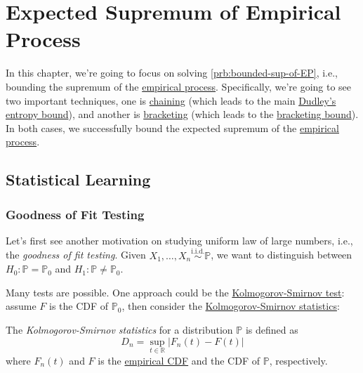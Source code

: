 \chapter{Expected Supremum of Empirical Process}
In this chapter, we're going to focus on solving \autoref{prb:bounded-sup-of-EP}, i.e., bounding the supremum of the \hyperref[def:EP]{empirical process}. Specifically, we're going to see two important techniques, one is \hyperref[note:chaining]{chaining} (which leads to the main \hyperref[thm:Dudley-entropy-bound]{Dudley's entropy bound}), and another is \hyperref[def:bracketing-number]{bracketing} (which leads to the \hyperref[thm:bracketing-bound]{bracketing bound}). In both cases, we successfully bound the expected supremum of the \hyperref[def:EP]{empirical process}.

\section{Statistical Learning}\label{sec:statistical-learning}
\subsection{Goodness of Fit Testing}
Let's first see another motivation on studying uniform law of large numbers, i.e., the \emph{goodness of fit testing}. Given \(X_1, \dots , X_n \overset{\text{i.i.d.}}{\sim } \mathbb{P} \), we want to distinguish between \(H_0 \colon \mathbb{P} = \mathbb{P} _0\) and \(H_1\colon \mathbb{P} \neq \mathbb{P} _0\).

Many tests are possible. One approach could be the \href{https://en.wikipedia.org/wiki/Kolmogorov-Smirnov_test}{Kolmogorov-Smirnov test}: assume \(F\) is the CDF of \(\mathbb{P} _0\), then consider the \hyperref[def:Kolmogorov-Smirnov-statistics]{Kolmogorov-Smirnov statistics}:

\begin{definition}\label{def:Kolmogorov-Smirnov-statistics}
	The \emph{Kolmogorov-Smirnov statistics} for a distribution \(\mathbb{P} \) is defined as
	\[
		D_n = \sup _{t\in \mathbb{R} } \vert F_n(t) - F(t) \vert
	\]
	where \(F_n(t)\) and \(F\) is the \hyperref[def:empirical-CDF]{empirical CDF} and the CDF of \(\mathbb{P} \), respectively.
\end{definition}

